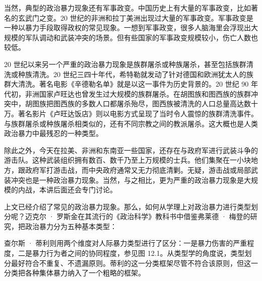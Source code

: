 当然，典型的政治暴力现象还有军事政变。中国历史上有大量的军事政变，比如著名的玄武门之变。20 世纪的非洲和拉丁美洲出现过大量的军事政变。军事政变是一种以暴力手段取得政权的常见现象。一想到军事政变，很多人脑海里会浮现出大规模的军队调动和武装冲突的场景。但有些国家的军事政变规模较小，伤亡人数也较低。

20 世纪以来另一个严重的政治暴力现象是族群屠杀或种族屠杀，甚至包括族群清洗或种族清洗。20 世纪三四十年代，希特勒就发动了针对德国和欧洲犹太人的族群大清洗。著名电影《辛德勒名单》就是以这一事件为历史背景的。20 世纪 90 年代初，非洲国家卢旺达也曾发生过大规模的族群屠杀。在胡图族和图西族的族群冲突中，胡图族把图西族的多数人口都屠杀殆尽，图西族被清洗的人口总量高达数十万。著名影片《卢旺达饭店》则以电影方式呈现了当时令人震惊的族群清洗事件。与族群屠杀或种族屠杀相类似的，还有不同宗教之间的教派屠杀。这大概也是人类政治暴力中最残忍的一种类型。

除此之外，今天在拉美、非洲和东南亚一些国家，还存在与政府军进行武装斗争的游击队。这种武装组织拥有数百、数千乃至上万规模的士兵。他们集聚在一小块地方，跟政府军打游击战，而中央政府通常又无力彻底清剿。无疑，游击战或局部武装冲突也是一种政治暴力现象。当然，与之相比，更为严重的政治暴力现象是大规模的内战，本讲后面还会专门讨论。


上文已经介绍了常见的政治暴力现象。那么，如何从学理上对政治暴力进行类型划分呢？迈克尔 · 罗斯金在其流行的《政治科学》教科书中借鉴弗莱德 · 梅登的研究，把政治暴力分为五种基本类型：


查尔斯 · 蒂利则用两个维度对人际暴力类型进行了区分：一是暴力伤害的严重程度，二是暴力行为者之间的协同程度，参见图 12.1。从类型学的角度说，类型划分最好符合不重复、不遗漏原则。蒂利的这一分类框架尽管不符合该原则，但这一分类把各种集体暴力纳入了一个粗略的框架。

